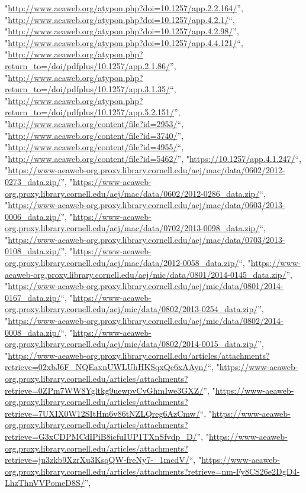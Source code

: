 \documentclass[]{article}
\begin{document}
\begin{itemize}
  "\url{http://www.aeaweb.org/atypon.php?doi=10.1257/app.2.2.164/}'',
  "\url{http://www.aeaweb.org/atypon.php?doi=10.1257/app.4.2.1/}``,
  "\url{http://www.aeaweb.org/atypon.php?doi=10.1257/app.4.2.98/}'',
  "\url{http://www.aeaweb.org/atypon.php?doi=10.1257/app.4.4.121/}``,
  "\url{http://www.aeaweb.org/atypon.php?return_to=/doi/pdfplus/10.1257/app.2.1.86/}'',
  "\url{http://www.aeaweb.org/atypon.php?return_to=/doi/pdfplus/10.1257/app.3.1.35/}``,
  "\url{http://www.aeaweb.org/atypon.php?return_to=/doi/pdfplus/10.1257/app.5.2.151/}'',
  "\url{http://www.aeaweb.org/content/file?id=2953/}``,
  "\url{http://www.aeaweb.org/content/file?id=3740/}'',
  "\url{http://www.aeaweb.org/content/file?id=4955/}``,
  "\url{http://www.aeaweb.org/content/file?id=5462/}'',
  "\url{https://10.1257/app.4.1.247/}``,
  "\url{https://www-aeaweb-org.proxy.library.cornell.edu/aej/mac/data/0602/2012-0273_data.zip/}'',
  "\url{https://www-aeaweb-org.proxy.library.cornell.edu/aej/mac/data/0602/2012-0286_data.zip/}``,
  "\url{https://www-aeaweb-org.proxy.library.cornell.edu/aej/mac/data/0603/2013-0006_data.zip/}'',
  "\url{https://www-aeaweb-org.proxy.library.cornell.edu/aej/mac/data/0702/2013-0098_data.zip/}``,
  "\url{https://www-aeaweb-org.proxy.library.cornell.edu/aej/mac/data/0703/2013-0108_data.zip/}'',
  "\url{https://www-aeaweb-org.proxy.library.cornell.edu/aej/mac/data/2012-0058_data.zip/}``,
  "\url{https://www-aeaweb-org.proxy.library.cornell.edu/aej/mic/data/0801/2014-0145_data.zip/}'',
  "\url{https://www-aeaweb-org.proxy.library.cornell.edu/aej/mic/data/0801/2014-0167_data.zip/}``,
  "\url{https://www-aeaweb-org.proxy.library.cornell.edu/aej/mic/data/0802/2013-0254_data.zip/}'',
  "\url{https://www-aeaweb-org.proxy.library.cornell.edu/aej/mic/data/0802/2014-0008_data.zip/}``,
  "\url{https://www-aeaweb-org.proxy.library.cornell.edu/aej/mic/data/0802/2014-0015_data.zip/}'',
  "\url{https://www-aeaweb-org.proxy.library.cornell.edu/articles/attachments?retrieve=02xbJ6F_NQEaxnUWLUhHKSqxQc6xAAyn/}``,
  "\url{https://www-aeaweb-org.proxy.library.cornell.edu/articles/attachments?retrieve=0ZPm7WW8Ygltkg9uewpvCvGhmIwe3GXZ/}'',
  "\url{https://www-aeaweb-org.proxy.library.cornell.edu/articles/attachments?retrieve=7UXIX0W12SItHm6v86tNZLQreg6AzCmw/}``,
  "\url{https://www-aeaweb-org.proxy.library.cornell.edu/articles/attachments?retrieve=G3xCDPMCdIPiB8icfuIUP1TXnSfvdp_D/}'',
  "\url{https://www-aeaweb-org.proxy.library.cornell.edu/articles/attachments?retrieve=ju3zkb9XzrXu3KsqQW-freNy7-_1mcdV/}``,
  "\url{https://www-aeaweb-org.proxy.library.cornell.edu/articles/attachments?retrieve=nm-Fy8CS26e2DgD4-LhzThnVVPomeD8S/}'',

\end{itemize}
\end{document}
